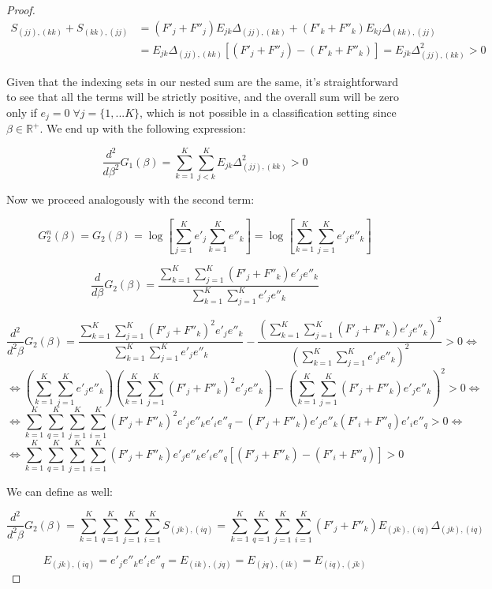 \begin{proof}
$$
\begin{aligned}
    S_{(jj), (kk)} + S_{(kk), (jj)} & = (F'_j + F''_j) E_{jk} \Delta_{(jj), (kk)} + (F'_k + F''_k) E_{kj} \Delta_{(kk), (jj)} \\
    & = E_{jk}\Delta_{(jj), (kk)} [(F'_j + F''_j) - (F'_k + F''_k)] = E_{jk}\Delta_{(jj), (kk)}^2 > 0
\end{aligned}
$$


Given that the indexing sets in our nested sum are the same, it's straightforward to see that all the terms will be strictly positive, and the overall sum will be zero only if $e_j = 0 \; \forall j=\{ 1,...K \}$, which is not possible in a classification setting since $\beta \in \mathbb{R}^+$. We end up with the following expression:

$$
\frac{d^2}{d \beta ^2} G_1(\beta) = \sum_{k=1}^K \sum_{j<k}^K E_{jk}\Delta_{(jj), (kk)}^2 > 0
$$

Now we proceed analogously with the second term: 

$$
G^n_2(\beta) = G_2(\beta) = \log \left [\sum_{j=1}^K e'_j \sum_{k=1}^K e''_k \right] = \log \left [\sum_{k=1}^K \sum_{j=1}^K e'_j e''_k \right]
$$

$$
\frac{d}{d \beta} G_2(\beta) = \frac{\sum_{k=1}^K \sum_{j=1}^K (F'_j + F''_k) e'_j e''_k}{\sum_{k=1}^K \sum_{j=1}^K e'_j e''_k}
$$

$$
\frac{d^2}{d^2 \beta} G_2(\beta) = \frac{\sum_{k=1}^K \sum_{j=1}^K (F'_j + F''_k)^2 e'_j e''_k}{\sum_{k=1}^K \sum_{j=1}^K e'_j e''_k} - \frac{\left(\sum_{k=1}^K \sum_{j=1}^K (F'_j + F''_k) e'_j e''_k \right)^2}{\left( \sum_{k=1}^K \sum_{j=1}^K e'_j e''_k\right)^2} > 0 \iff
$$
$$
\iff \left(\sum_{k=1}^K \sum_{j=1}^K e'_j e''_k \right) \left(\sum_{k=1}^K \sum_{j=1}^K (F'_j + F''_k)^2 e'_j e''_k \right) - \left(\sum_{k=1}^K \sum_{j=1}^K (F'_j + F''_k) e'_j e''_k \right)^2 > 0 \iff
$$
$$
\iff \sum_{k=1}^K \sum_{q=1}^K \sum_{j=1}^K \sum_{i=1}^K (F'_j + F''_k)^2 e'_j e''_k e'_i e''_q - (F'_j + F''_k) e'_j e''_k (F'_i + F''_q) e'_i e''_q > 0 \iff
$$
$$
\iff \sum_{k=1}^K \sum_{q=1}^K \sum_{j=1}^K \sum_{i=1}^K (F'_j + F''_k) e'_j e''_k e'_i e''_q [(F'_j + F''_k) - (F'_i + F''_q)] > 0
$$

We can define as well:

$$
\frac{d^2}{d^2 \beta} G_2(\beta) = \sum_{k=1}^K \sum_{q=1}^K \sum_{j=1}^K \sum_{i=1}^K S_{(jk),(iq)} = \sum_{k=1}^K \sum_{q=1}^K \sum_{j=1}^K \sum_{i=1}^K (F'_j + F''_k) E_{(jk),(iq)} \Delta_{(jk),(iq)} 
$$

$$
E_{(jk),(iq)} = e'_j e''_k e'_i e''_q = E_{(ik),(jq)} = E_{(jq),(ik)} = E_{(iq),(jk)}
$$


\end{proof}
